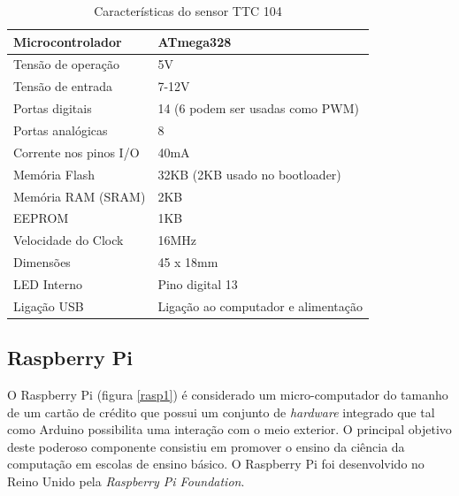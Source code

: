 \begin{table}[h]
	\centering
	
	\begin{tabular}{|
			>{\columncolor[HTML]{C0C0C0}}l |l|} \hline
		Microcontrolador & ATmega328 \\ \hline
		Tensão de operação & 5V \\ \hline
		Tensão de entrada & 7-12V \\ \hline
		Portas digitais & 14 (6 podem ser usadas como PWM) \\ \hline
		Portas analógicas & 8 \\ \hline
		Corrente nos pinos I/O & 40mA \\ \hline
		Memória Flash & 32KB (2KB usado no bootloader) \\ \hline
		Memória RAM (SRAM) & 2KB \\ \hline
		EEPROM & 1KB \\ \hline
		Velocidade do Clock & 16MHz \\ \hline
		Dimensões & 45 x 18mm \\ \hline
		LED Interno & Pino digital 13 \\ \hline
		Ligação USB & Ligação ao computador e alimentação \\ \hline
	\end{tabular}
	\caption{Características do sensor TTC 104}
	\label{caraarduino}
\end{table}







\newpage

\subsection{Raspberry Pi }

O Raspberry Pi (figura \ref{rasp1}) é considerado um micro-computador do tamanho de um cartão de crédito que possui um conjunto de \textit{hardware} integrado que tal como Arduino possibilita uma interação com o meio exterior. O principal objetivo deste poderoso componente consistiu em promover o ensino da ciência da computação em escolas de ensino básico. 
O Raspberry Pi foi desenvolvido no Reino Unido pela \textit{Raspberry Pi Foundation}.




